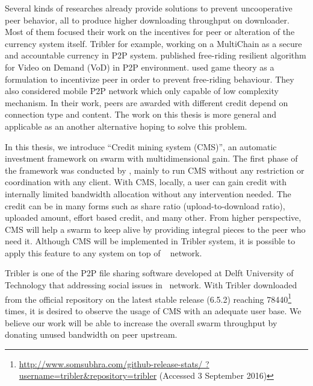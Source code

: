 Several kinds of researches already provide solutions to prevent uncooperative peer behavior, all to produce higher downloading throughput on downloader. Most of them focused their work on the incentives for peer or alteration of the currency system itself. Tribler for example, working on a MultiChain \cite{2015:multichain:norberhuis} as a secure and accountable currency in P2P system. \citeauthor{2008:givetogetvod:Mol} published free-riding resilient algorithm for Video on Demand (VoD) in P2P environment\cite{2008:givetogetvod:Mol}. \citeauthor{2015:incentivep2pgame:kang} used game theory as a formulation to incentivize peer in order to prevent free-riding behaviour\cite{2015:incentivep2pgame:kang}. They also considered mobile P2P network which only capable of low complexity mechanism. In their work, peers are awarded with different credit depend on connection type and content. The work on this thesis is more general and applicable as an another alternative hoping to solve this problem. 

In this thesis, we introduce ``Credit mining system (CMS)'', an automatic investment framework on swarm with multidimensional gain. The first phase of the framework was conducted by \citeauthor{2015:creditmining:capota}, mainly to run CMS without any restriction or coordination with any client. With CMS, locally, a user can gain credit with internally limited bandwidth allocation without any intervention needed. The credit can be in many forms such as share ratio (upload-to-download ratio), uploaded amount, effort based credit, and many other. From higher perspective, CMS will help a swarm to keep alive by providing integral pieces to the peer who need it. Although CMS will be implemented in Tribler system, it is possible to apply this feature to any system on top of \bt~ network.

Tribler is one of the P2P file sharing software developed at Delft University of Technology that addressing social issues in \bt~network\cite{2008:tribler:pouwelse}. With Tribler downloaded from the official repository on the latest stable release (6.5.2) reaching  78440\footnote{\url{http://www.somsubhra.com/github-release-stats/ ?username=tribler&repository=tribler} (Accessed 3 September 2016)} times, it is desired to observe the usage of CMS with an adequate user base. We believe our work will be able to increase the overall swarm throughput by donating unused bandwidth on peer upstream.


